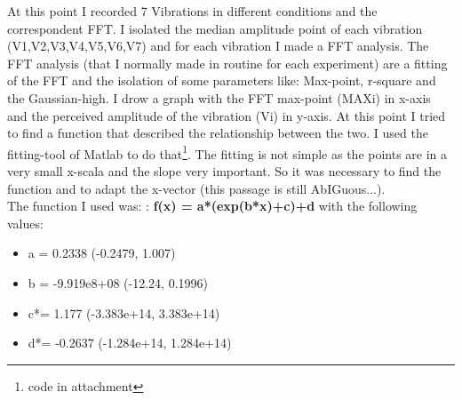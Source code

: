 \documentclass[11pt, a4paper]{article}
\begin{document}
At this point I recorded 7 Vibrations in different conditions and the correspondent FFT. I isolated the median amplitude point of each vibration (V1,V2,V3,V4,V5,V6,V7) and for each vibration I made a FFT analysis.%
The FFT analysis (that I normally made in routine for each experiment) are a fitting of the FFT and the isolation of some parameters like: Max-point, r-square and the Gaussian-high.
I drow a graph with the FFT max-point (MAXi) in x-axis and the perceived amplitude of the vibration (Vi) in y-axis. At this point I tried to find a function that described the relationship between the two. I used the fitting-tool of Matlab to do that\footnote{code in attachment}. The fitting is not simple as the points are in a very small x-scala and the slope very important. So it was necessary to find the function and to adapt the x-vector (this passage is still AbIGuous...). %
\\The function I used was: :  \textbf{f(x) = a*(exp(b*x)+c)+d}  with the following values: 
\begin{itemize}
   \item a =  0.2338 (-0.2479, 1.007)
   \item b =  -9.919e8+08 (-12.24, 0.1996)
   \item c*=  1.177 (-3.383e+14, 3.383e+14) 
   \item d*=  -0.2637  (-1.284e+14, 1.284e+14)
\end{itemize}
\end{document}
